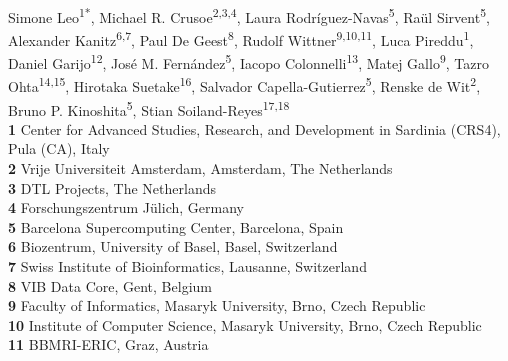 \documentclass[10pt,letterpaper]{article}
\begin{document}
\vspace*{0.2in}

\begin{flushleft}
{\Large
\textbf{} %
}
\newline
\\

Simone Leo\textsuperscript{1*},
Michael R. Crusoe\textsuperscript{2,3,4},
Laura Rodríguez-Navas\textsuperscript{5}, 
Raül Sirvent\textsuperscript{5}, 
Alexander Kanitz\textsuperscript{6,7}, 
Paul De Geest\textsuperscript{8}, 
Rudolf Wittner\textsuperscript{9,10,11}, 
Luca Pireddu\textsuperscript{1}, 
Daniel Garijo\textsuperscript{12}, 
José M. Fernández\textsuperscript{5}, 
Iacopo Colonnelli\textsuperscript{13}, 
Matej Gallo\textsuperscript{9}, 
Tazro Ohta\textsuperscript{14,15}, 
Hirotaka Suetake\textsuperscript{16}, 
Salvador Capella-Gutierrez\textsuperscript{5}, 
Renske de Wit\textsuperscript{2}, 
Bruno P. Kinoshita\textsuperscript{5}, 
Stian Soiland-Reyes\textsuperscript{17,18}
\\
\bigskip
\textbf{1} Center for Advanced Studies, Research, and Development in Sardinia (CRS4), Pula (CA), Italy
\\
\textbf{2} Vrije Universiteit Amsterdam, Amsterdam, The Netherlands
\\
\textbf{3} DTL Projects, The Netherlands
\\
\textbf{4} Forschungszentrum Jülich, Germany
\\
\textbf{5} Barcelona Supercomputing Center, Barcelona, Spain
\\
\textbf{6} Biozentrum, University of Basel, Basel, Switzerland
\\
\textbf{7} Swiss Institute of Bioinformatics, Lausanne, Switzerland
\\
\textbf{8} VIB Data Core, Gent, Belgium
\\
\textbf{9} Faculty of Informatics, Masaryk University, Brno, Czech Republic
\\
\textbf{10} Institute of Computer Science, Masaryk University, Brno, Czech Republic
\\
\textbf{11} BBMRI-ERIC, Graz, Austria

\end{flushleft}
\end{document}
